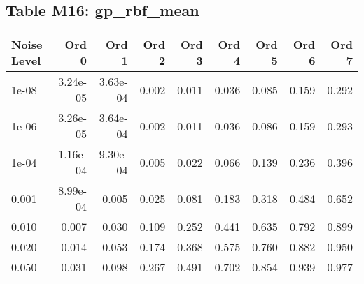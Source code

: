\clearpage

\subsection*{Table M16: gp\_rbf\_mean}

\begin{longtable}{lrrrrrrrr}
\toprule
\textbf{Noise Level} & \textbf{Ord 0} & \textbf{Ord 1} & \textbf{Ord 2} & \textbf{Ord 3} & \textbf{Ord 4} & \textbf{Ord 5} & \textbf{Ord 6} & \textbf{Ord 7} \\
\midrule
\endhead
1e-08 & 3.24e-05 & 3.63e-04 & 0.002 & 0.011 & 0.036 & 0.085 & 0.159 & 0.292 \\
1e-06 & 3.26e-05 & 3.64e-04 & 0.002 & 0.011 & 0.036 & 0.086 & 0.159 & 0.293 \\
1e-04 & 1.16e-04 & 9.30e-04 & 0.005 & 0.022 & 0.066 & 0.139 & 0.236 & 0.396 \\
0.001 & 8.99e-04 & 0.005 & 0.025 & 0.081 & 0.183 & 0.318 & 0.484 & 0.652 \\
0.010 & 0.007 & 0.030 & 0.109 & 0.252 & 0.441 & 0.635 & 0.792 & 0.899 \\
0.020 & 0.014 & 0.053 & 0.174 & 0.368 & 0.575 & 0.760 & 0.882 & 0.950 \\
0.050 & 0.031 & 0.098 & 0.267 & 0.491 & 0.702 & 0.854 & 0.939 & 0.977 \\
\bottomrule
\end{longtable}

\clearpage

